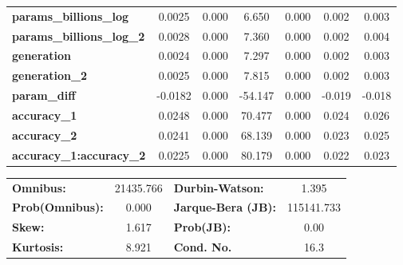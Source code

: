\begin{center}
\begin{tabular}{lcccccc}
\textbf{params\_billions\_log}      &       0.0025  &        0.000     &     6.650  &         0.000        &        0.002    &        0.003     \\
\textbf{params\_billions\_log\_2}   &       0.0028  &        0.000     &     7.360  &         0.000        &        0.002    &        0.004     \\
\textbf{generation}                 &       0.0024  &        0.000     &     7.297  &         0.000        &        0.002    &        0.003     \\
\textbf{generation\_2}              &       0.0025  &        0.000     &     7.815  &         0.000        &        0.002    &        0.003     \\
\textbf{param\_diff}                &      -0.0182  &        0.000     &   -54.147  &         0.000        &       -0.019    &       -0.018     \\
\textbf{accuracy\_1}                &       0.0248  &        0.000     &    70.477  &         0.000        &        0.024    &        0.026     \\
\textbf{accuracy\_2}                &       0.0241  &        0.000     &    68.139  &         0.000        &        0.023    &        0.025     \\
\textbf{accuracy\_1:accuracy\_2}    &       0.0225  &        0.000     &    80.179  &         0.000        &        0.022    &        0.023     \\
\bottomrule
\end{tabular}
\begin{tabular}{lclc}
\textbf{Omnibus:}       & 21435.766 & \textbf{  Durbin-Watson:     } &     1.395   \\
\textbf{Prob(Omnibus):} &    0.000  & \textbf{  Jarque-Bera (JB):  } & 115141.733  \\
\textbf{Skew:}          &    1.617  & \textbf{  Prob(JB):          } &      0.00   \\
\textbf{Kurtosis:}      &    8.921  & \textbf{  Cond. No.          } &      16.3   \\
\bottomrule
\end{tabular}
\end{center}